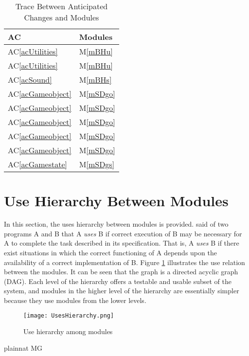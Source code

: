 \documentclass[12pt, titlepage]{article}
\newcommand{\acref}[1]{AC\ref{#1}}
\newcommand{\mref}[1]{M\ref{#1}}
\begin{document}
\begin{table}[H]
\centering
\begin{tabular}{p{} p{}}
\toprule
\textbf{AC} & \textbf{Modules}\\
\midrule
\acref{acUtilities} & \mref{mBHu}\\
\acref{acUtilities} & \mref{mBHu}\\
\acref{acSound} & \mref{mBHs}\\
\acref{acGameobject} & \mref{mSDgo}\\
\acref{acGameobject} & \mref{mSDgo}\\
\acref{acGameobject} & \mref{mSDgo}\\
\acref{acGameobject} & \mref{mSDgo}\\
\acref{acGameobject} & \mref{mSDgo}\\
\acref{acGamestate} & \mref{mSDgs}\\
\bottomrule
\end{tabular}
\caption{Trace Between Anticipated Changes and Modules}
\label{TblACT}
\end{table}

\section{Use Hierarchy Between Modules} \label{SecUse}

In this section, the uses hierarchy between modules is
provided. \citet{Parnas1978} said of two programs A and B that A {\em uses} B if
correct execution of B may be necessary for A to complete the task described in
its specification. That is, A {\em uses} B if there exist situations in which
the correct functioning of A depends upon the availability of a correct
implementation of B.  Figure \ref{FigUH} illustrates the use relation between
the modules. It can be seen that the graph is a directed acyclic graph
(DAG). Each level of the hierarchy offers a testable and usable subset of the
system, and modules in the higher level of the hierarchy are essentially simpler
because they use modules from the lower levels.

\begin{figure}[H]
\centering
\texttt{[image: UsesHierarchy.png]}
\caption{Use hierarchy among modules}
\label{FigUH}
\end{figure}


 {plainnat}
 {MG}
\end{document}
